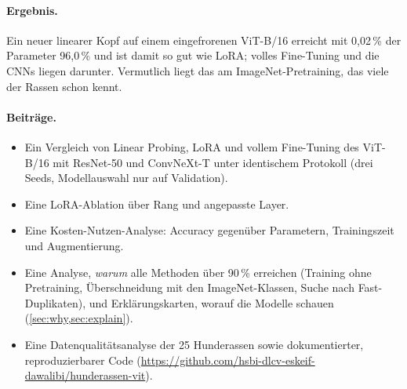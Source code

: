 \paragraph{Ergebnis.}
Ein neuer linearer Kopf auf einem eingefrorenen ViT-B/16 erreicht mit 0,02\,\% der Parameter 96,0\,\% und
ist damit so gut wie LoRA; volles Fine-Tuning und die CNNs liegen darunter. Vermutlich liegt das am
ImageNet-Pretraining, das viele der Rassen schon kennt.

\paragraph{Beiträge.}
\begin{itemize}
  \item Ein Vergleich von Linear Probing, LoRA und vollem Fine-Tuning des ViT-B/16 mit ResNet-50 und
        ConvNeXt-T unter identischem Protokoll (drei Seeds, Modellauswahl nur auf Validation).
  \item Eine LoRA-Ablation über Rang und angepasste Layer.
  \item Eine Kosten-Nutzen-Analyse: Accuracy gegenüber Parametern, Trainingszeit und Augmentierung.
  \item Eine Analyse, \emph{warum} alle Methoden über 90\,\% erreichen (Training ohne Pretraining,
        Überschneidung mit den ImageNet-Klassen, Suche nach Fast-Duplikaten), und Erklärungskarten,
        worauf die Modelle schauen (\cref{sec:why,sec:explain}).
  \item Eine Datenqualitätsanalyse der 25 Hunderassen sowie dokumentierter, reproduzierbarer Code
        (\url{https://github.com/hsbi-dlcv-eskeif-dawalibi/hunderassen-vit}).
\end{itemize}

